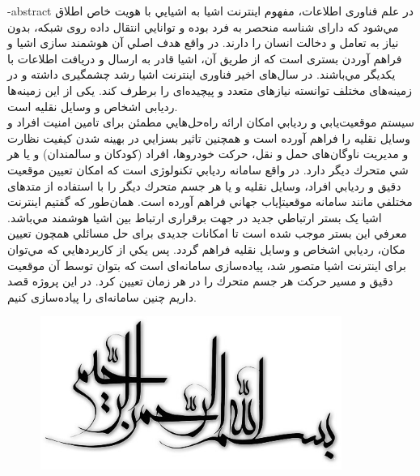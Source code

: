 
 
\surname{}

\fa-abstract{
در علم فناوری اطلاعات، مفهوم اينترنت اشيا به اشيايي با هويت خاص اطلاق مي‌شود كه دارای شناسه منحصر به فرد بوده و توانايي انتقال داده روی شبکه، بدون نياز به تعامل و دخالت انسان را دارند. در واقع هدف اصلي آن هوشمند سازی اشيا و فراهم آوردن بستری است كه از طريق آن،
اشيا قادر به ارسال و دريافت اطلاعات با يکديگر مي‌باشند.
در سال‌های اخير فناوری اينترنت اشيا رشد چشمگيری داشته و در زمينه‌های مختلف توانسته نيازهای متعدد و پيچيده‌ای را برطرف كند. یکی از این زمینه‌ها ردیابی اشخاص و وسایل نقلیه است. 
\\
سيستم موقعيت‌يابي و رديابي امکان ارائه راه‌حل‌هايي مطمئن برای تامين امنيت افراد و وسايل نقليه را فراهم آورده است و همچنين تاثير بسزايي در بهينه شدن كيفيت نظارت و مديريت
ناوگان‌های حمل و نقل، حركت خودروها، افراد (کودکان و سالمندان) و يا هر شي متحرك ديگر دارد. در واقع سامانه رديابي تکنولوژی است كه امکان تعيين موقعيت دقيق و رديابي افراد، وسايل نقليه و يا هر جسم متحرك ديگر را با استفاده از متدهای مختلفي مانند
سامانه موقعيتإياب جهاني فراهم آورده است.
همان‌طور كه گفتيم اينترنت اشيا يک بستر ارتباطي جديد در جهت برقراری ارتباط بين اشيا هوشمند مي‌باشد. معرفي اين بستر موجب شده است تا امکانات جديدی برای حل مسائلي همچون تعيين مکان، رديابي اشخاص و وسايل نقليه فراهم گردد. پس يکي از كاربردهايي كه مي‌توان برای اينترنت اشيا متصور شد، پياده‌سازی سامانه‌ای است كه بتوان توسط آن موقعيت دقيق و مسير حركت هر جسم متحرك را در هر زمان تعيين كرد. در اين پروژه قصد داريم چنين سامانه‌ای را پياده‌سازی كنيم.
}





\AUTtitle
\vspace*{7cm}
\thispagestyle{empty}
\begin{center}
\includegraphics[height=5cm,width=12cm]{besm}
\end{center}